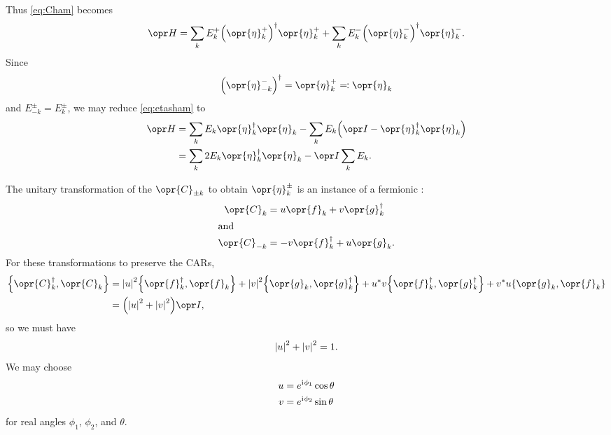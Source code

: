 \documentclass[../thesis.tex]{subfiles}
\begin{document}
Thus \cref{eq:Cham} becomes
\begin{equation}
  \ham
  = \sum_k E_k^+{\qty(\opr{\eta}_k^+)}^\dag\opr{\eta}_k^+
  + \sum_k E_k^-{\qty(\opr{\eta}_k^-)}^\dag\opr{\eta}_k^-.
  \label{eq:etasham}
\end{equation}
Since
\begin{equation}
  {\qty(\opr{\eta}_{-k}^-)}^\dag
  = \opr{\eta}_k^+
  \eqqcolon \opr{\eta}_k
\end{equation}
and $E_{-k}^\pm = E_k^\pm$, we may reduce \cref{eq:etasham} to
\begin{align}
  \ham
  &= \sum_k E_k\opr{\eta}_k^\dag \opr{\eta}_k
  - \sum_k E_k\qty(\idopr - \opr{\eta}_k^\dag \opr{\eta}_k)
  \\
  &= \sum_k 2E_k\opr{\eta}_k^\dag\opr{\eta}_k
  - \idopr\sum_k E_k.
  \label{eq:etaham}
\end{align}

The unitary transformation of the $\opr{C}_{\pm k}$ to obtain $\opr{\eta}_k^\pm$
is an instance of a fermionic :
\begin{subequations}
  \begin{align}
    \opr{C}_k
  &= u\opr{f}_k + v\opr{g}_k^\dag \\
  \shortintertext{and}
  \opr{C}_{-k}
  &= -v\opr{f}_k^\dag + u\opr{g}_k.
  \end{align}\label{eq:bogoliubov}
\end{subequations}
For these transformations to preserve the CARs,
\begin{align}
  \acomm{\opr{C}_k^\dag}{\opr{C}_k}
  &= \abs{u}^2 \acomm{\opr{f}_k^\dag}{\opr{f}_k}
  + \abs{v}^2 \acomm{\opr{g}_k}{\opr{g}_k^\dag}
  + u^* v \acomm{\opr{f}_k^\dag}{\opr{g}_k^\dag}
  + v^* u \acomm{\opr{g}_k}{\opr{f}_k} \\
  &= \qty(\abs{u}^2 + \abs{v}^2) \idopr,
\end{align}
so we must have
\begin{equation}
  \abs{u}^2 + \abs{v}^2 = 1.
\end{equation}
We may choose
  \begin{align}
    u &= e^{\mathrm{i}\mkern1mu\phi_1}\cos\theta \\
    v &= e^{\mathrm{i}\mkern1mu\phi_2}\sin\theta
  \end{align}\label{eq:uv-param}
for real angles $\phi_1$, $\phi_2$, and $\theta$.
\end{document}
